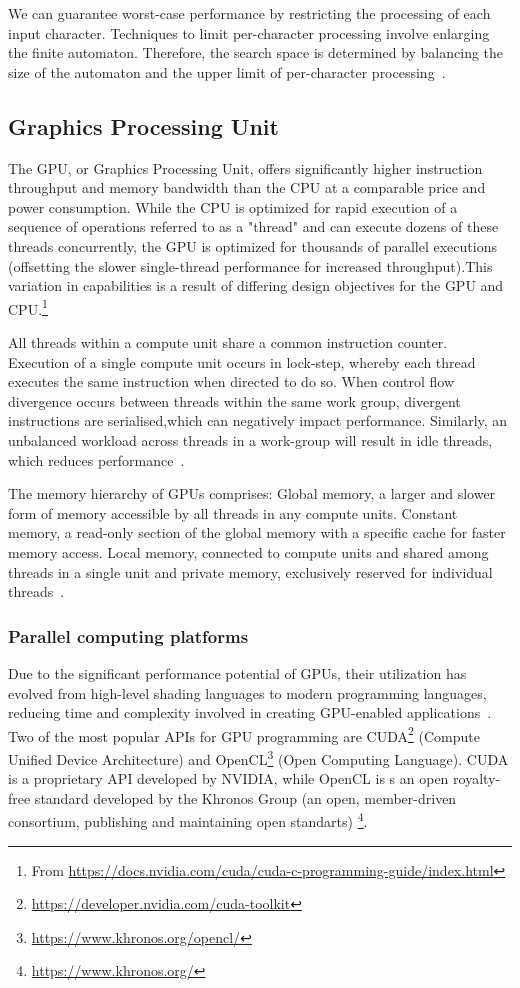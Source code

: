 \documentclass[10pt,onecolumn,twoside,english,a4paper]{article}
\begin{document}
We can guarantee worst-case performance by restricting the processing of each input character. Techniques to limit per-character processing involve enlarging the finite automaton. Therefore, the search space is determined by balancing the size of the automaton and the upper limit of per-character processing~\cite{Nourian:DemystifyingFSA}.

\subsection{Graphics Processing Unit} \label{GPU}
The GPU, or Graphics Processing Unit, offers significantly higher instruction throughput and memory bandwidth than the CPU at a comparable price and power consumption.
While the CPU is optimized for rapid execution of a sequence of operations referred to as a "thread" and can execute dozens of these threads concurrently, the GPU is optimized for thousands of parallel executions (offsetting the slower single-thread performance for increased throughput).This variation in capabilities is a result of differing design objectives for the GPU and CPU.\footnote{From \url{https://docs.nvidia.com/cuda/cuda-c-programming-guide/index.html}}

All threads within a compute unit share a common instruction counter. Execution of a single compute unit occurs in lock-step, whereby each thread executes the same instruction when directed to do so. When control flow divergence occurs between threads within the same work group, divergent instructions are serialised,which can negatively impact performance.
Similarly, an unbalanced workload across threads in a work-group will result in idle threads, which reduces performance~\cite{yaneva2022gpuaccelerationFSA}.

The memory hierarchy of GPUs comprises: Global memory, a larger and slower form of memory accessible by all threads in any compute units. Constant memory, a read-only section of the global memory with a specific cache for faster memory access. Local memory, connected to compute units and shared among threads in a single unit and private memory, exclusively reserved for individual threads~\cite{yaneva2022gpuaccelerationFSA}.

\subsubsection{Parallel computing platforms} \label{Parallel computing platforms}
Due to the significant performance potential of GPUs, their  utilization has evolved from high-level shading languages to modern programming languages, reducing time and complexity involved in creating GPU-enabled applications~\cite{Asaduzzaman:Impact_CUDA_OpenCL}.
Two of the most popular APIs for GPU programming are CUDA\footnote{\url{https://developer.nvidia.com/cuda-toolkit}} (Compute Unified Device Architecture) and OpenCL\footnote{\url{https://www.khronos.org/opencl/}} (Open Computing Language). CUDA is a proprietary API developed by NVIDIA, while OpenCL is s an open royalty-free standard developed by the Khronos Group (an open, member-driven consortium, publishing and maintaining open standarts) \footnote{\url{https://www.khronos.org/}}.
\end{document}
